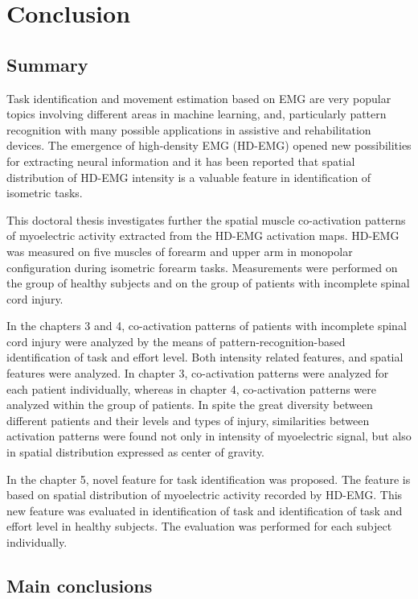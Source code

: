 \chapter{Conclusion}
\label{ch:conclusions}

\section{Summary}

Task identification and movement estimation based on EMG are very popular topics involving different areas in machine learning, and, particularly pattern recognition with many possible applications in assistive and rehabilitation devices. The emergence of high-density EMG (HD-EMG) opened new possibilities for extracting neural information and it has been reported that spatial distribution of HD-EMG intensity is a valuable feature in identification of isometric tasks.

This doctoral thesis investigates further the spatial muscle co-activation patterns of myoelectric activity extracted from the HD-EMG activation maps. HD-EMG was measured on five muscles of forearm and upper arm in monopolar configuration during isometric forearm tasks. Measurements were performed on the group of healthy subjects and on the group of patients with incomplete spinal cord injury.

In the chapters 3 and 4, co-activation patterns of patients with incomplete spinal cord injury were analyzed by the means of pattern-recognition-based identification of task and effort level. Both intensity related features, and spatial features were analyzed. In chapter 3, co-activation patterns were analyzed for each patient individually, whereas in chapter 4, co-activation patterns were analyzed within the group of patients. In spite the great diversity between different patients and their levels and types of injury, similarities between activation patterns were found not only in intensity of myoelectric signal, but also in spatial distribution expressed as center of gravity.

In the chapter 5, novel feature for task identification was proposed. The feature is based on spatial distribution of myoelectric activity recorded by HD-EMG. This new feature was evaluated in identification of task and identification of task and effort level in healthy subjects. The evaluation was performed for each subject individually. 


\section{Main conclusions}

